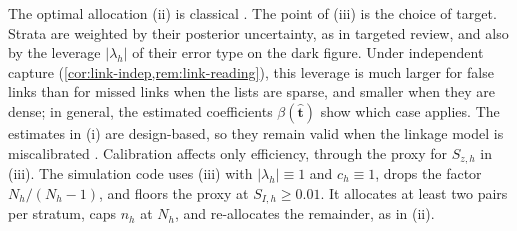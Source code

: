 The optimal allocation (ii) is classical \citep{neyman1934,cochran1977}. The point of (iii) is the choice of target. Strata are weighted by their posterior uncertainty, as in targeted review, and also by the leverage $|\lambda_h|$ of their error type on the dark figure. Under independent capture (\cref{cor:link-indep,rem:link-reading}), this leverage is much larger for false links than for missed links when the lists are sparse, and smaller when they are dense; in general, the estimated coefficients $\beta(\hat{\bm t})$ show which case applies. The estimates in (i) are design-based, so they remain valid when the linkage model is miscalibrated \citep{belin1995}. Calibration affects only efficiency, through the proxy for $S_{z,h}$ in (iii). The simulation code uses (iii) with $|\lambda_h|\equiv1$ and $c_h\equiv1$, drops the factor $N_h/(N_h-1)$, and floors the proxy at $S_{I,h}\ge0.01$. It allocates at least two pairs per stratum, caps $n_h$ at $N_h$, and re-allocates the remainder, as in (ii).
